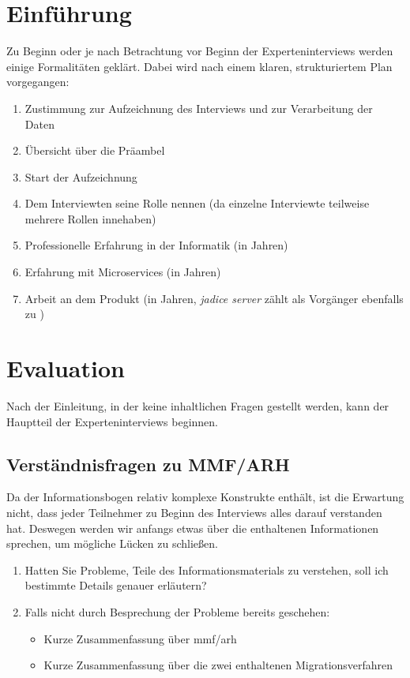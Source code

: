 \section{Einführung}

Zu Beginn oder je nach Betrachtung vor Beginn der Experteninterviews werden einige Formalitäten geklärt.
Dabei wird nach einem klaren, strukturiertem Plan vorgegangen:

\begin{enumerate}
	\item Zustimmung zur Aufzeichnung des Interviews und zur Verarbeitung der Daten
	\item Übersicht über die Präambel
	\item Start der Aufzeichnung
	\item Dem Interviewten seine Rolle nennen (da einzelne Interviewte teilweise mehrere Rollen innehaben)
	\item Professionelle Erfahrung in der Informatik (in Jahren)
	\item Erfahrung mit Microservices (in Jahren)
	\item Arbeit an dem Produkt (in Jahren, \emph{jadice server} zählt als Vorgänger ebenfalls zu \jf)
\end{enumerate}

\section{Evaluation}

Nach der Einleitung, in der keine inhaltlichen Fragen gestellt werden, kann der Hauptteil der Experteninterviews beginnen.

\subsection{Verständnisfragen zu MMF/ARH}

Da der Informationsbogen relativ komplexe Konstrukte enthält, ist die Erwartung nicht, dass jeder Teilnehmer zu Beginn des Interviews alles darauf verstanden hat.
Deswegen werden wir anfangs etwas über die enthaltenen Informationen sprechen, um mögliche Lücken zu schließen.

\begin{enumerate}
	\item Hatten Sie Probleme, Teile des Informationsmaterials zu verstehen, soll ich bestimmte Details genauer erläutern?
	\item Falls nicht durch Besprechung der Probleme bereits geschehen: 
	\begin{itemize}
		\item Kurze Zusammenfassung über \gls{mmf}/\gls{arh}
		\item Kurze Zusammenfassung über die zwei enthaltenen Migrationsverfahren
	\end{itemize}
\end{enumerate}

